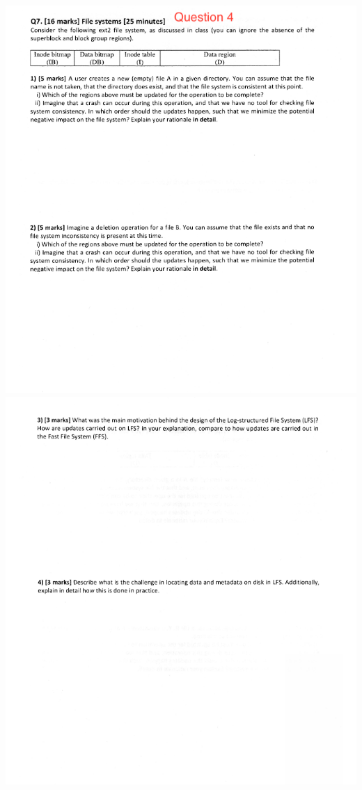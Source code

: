 \documentclass[12pt]{article}
\begin{document}
\begin{center}
\includegraphics[width=\linewidth]{../images/midterm_4_5.png}
\includegraphics[width=\linewidth]{../images/midterm_4_6.png}

\end{center}
\end{document}
